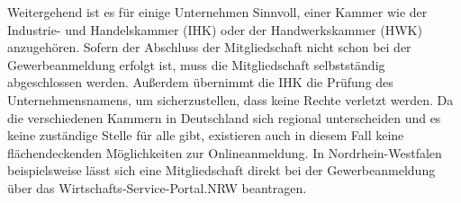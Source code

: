 Weitergehend ist es für einige Unternehmen Sinnvoll, einer Kammer wie der Industrie- und Handelskammer (IHK) oder der Handwerkskammer (HWK) anzugehören. Sofern der Abschluss der Mitgliedschaft nicht schon bei der Gewerbeanmeldung erfolgt ist, muss die Mitgliedschaft selbstständig abgeschlossen werden. Außerdem übernimmt die IHK die Prüfung des Unternehmensnamens, um sicherzustellen, dass keine Rechte verletzt werden.
Da die verschiedenen Kammern in Deutschland sich regional unterscheiden und es keine zuständige Stelle für alle gibt, existieren auch in diesem Fall keine flächendeckenden Möglichkeiten zur Onlineanmeldung. In Nordrhein-Westfalen beispielsweise lässt sich eine Mitgliedschaft direkt bei der Gewerbeanmeldung über das Wirtschafts-Service-Portal.NRW beantragen.
